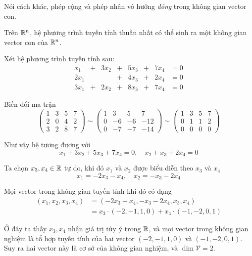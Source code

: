 Nói cách khác, phép cộng và phép nhân vô hướng \textit{đóng} trong
không gian vector con.

\begin{remark}
    Trên $\mathbb{R}^n$, hệ phương trình tuyến tính thuần nhất có thể sinh
    ra một không gian vector con của $\mathbb{R}^n$.
\end{remark}

\begin{example}
    Xét hệ phương trình tuyến tính sau:
    \begin{equation*}
        \begin{array}{cccccccc}
            x_1 & + & 3x_2 & + & 5x_3 & + & 7x_4 & = 0 \\
            2x_1 & & & + & 4x_3 & + & 2x_4 & = 0 \\
            3x_1 & + & 2x_2 & + & 8x_3 & + & 7x_4 & = 0
        \end{array}
    \end{equation*}

    Biến đổi ma trận
    \begin{equation*}
        \begin{pmatrix}
            1 & 3 & 5 & 7 \\
            2 & 0 & 4 & 2 \\
            3 & 2 & 8 & 7
        \end{pmatrix} \sim \begin{pmatrix}
            1 & 3 & 5 & 7 \\
            0 & -6 & -6 & -12 \\
            0 & -7 & -7 & -14
        \end{pmatrix} \sim \begin{pmatrix}
            1 & 3 & 5 & 7 \\
            0 & 1 & 1 & 2 \\
            0 & 0 & 0 & 0
        \end{pmatrix}
    \end{equation*}

    Như vậy hệ tương đương với
    \[x_1 + 3x_2 + 5x_3 + 7x_4 = 0, \quad x_2 + x_3 + 2x_4 = 0\]

    Ta chọn $x_3, x_4 \in \mathbb{R}$ tự do, khi đó $x_1$ và $x_2$ được 
    biểu diễn theo $x_3$ và $x_4$ 
    \begin{equation*}
        x_1 = -2x_3 - x_4, \quad x_2 = -x_3 - 2x_4
    \end{equation*}

    Mọi vector trong không gian tuyến tính khi đó có dạng
    \begin{align*}
        (x_1, x_2, x_3, x_4) & = (-2x_3 - x_4, -x_3 - 2x_4, x_3, x_4)
        \\ & = x_3 \cdot (-2, -1, 1, 0) + x_4 \cdot (-1, -2, 0, 1) 
    \end{align*}

    Ở đây ta thấy $x_3, x_4$ nhận giá trị tùy ý trong $\mathbb{R}$, và
    mọi vector trong không gian nghiệm là tổ hợp tuyến tính của
    hai vector $(-2, -1, 1, 0)$ và $(-1, -2, 0, 1)$. Suy ra hai vector
    này là cơ sở của không gian nghiệm, và $\dim \mathcal{V} = 2$.

\end{example}

